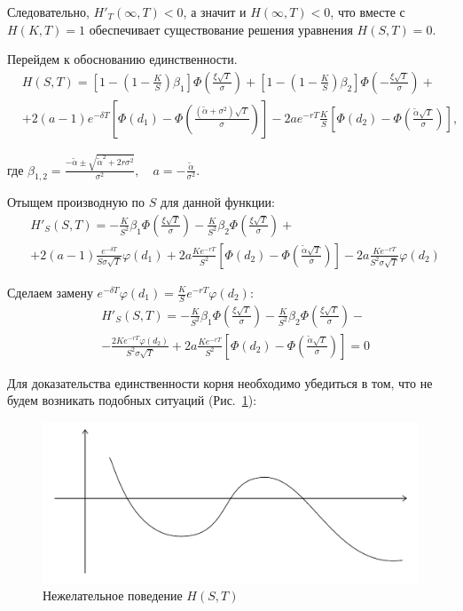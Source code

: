 \documentclass[oneside,final,12pt]{article}
\begin{document}
Следовательно, $H'_T(\infty,T)<0$, а значит и $H(\infty,T)<0$, что вместе с $H(K,T)=1$ обеспечивает существование решения уравнения $H(S,T)=0$.

Перейдем к обоснованию единственности. 
\begin{align*}
    & H(S,T) = \left[ 1 - \left(1-\frac{K}{S} \right)\beta_1 \right] \Phi\left(\frac{\xi\sqrt{T}}{\sigma}\right)
    + \left[ 1 - \left(1-\frac{K}{S} \right)\beta_2 \right] \Phi\left(-\frac{\xi\sqrt{T}}{\sigma}\right) + \\
    & + 2(a-1)e^{-\delta T} \left[ \Phi\left(d_1\right) - \Phi\left(\frac{(\widetilde{\alpha}+\sigma^2)\sqrt{T}}{\sigma}\right) \right] - 2ae^{-rT}\frac{K}{S} \left[ \Phi\left(d_2\right) - \Phi\left(\frac{\widetilde{\alpha}\sqrt{T}}{\sigma}\right) \right],
\end{align*}

\noindent
где $\beta_{1,2}=\frac{-\widetilde{\alpha}\pm\sqrt{\widetilde{\alpha}^2+2r\sigma^2}}{\sigma^2}, \quad a = -\frac{\widetilde{\alpha}}{\sigma^2}$.

Отыщем производную по $S$ для данной функции:
\begin{align*}
    & H'_S(S,T)=-\frac{K}{S^2}\beta_1 \Phi\left(\frac{\xi\sqrt{T}}{\sigma}\right) -\frac{K}{S^2}\beta_2 \Phi\left(\frac{\xi\sqrt{T}}{\sigma}\right) + \\ 
    & + 2(a-1)\frac{e^{-\delta T}}{S\sigma\sqrt{T}} \varphi(d_1) + 2a\frac{Ke^{-rT}}{S^2}\left[\Phi(d_2)-\Phi\left(\frac{\widetilde{\alpha}\sqrt{T}}{\sigma}\right)\right] - 2a\frac{Ke^{-rT}}{S^2\sigma\sqrt{T}} \varphi(d_2)
\end{align*}

Сделаем замену $e^{-\delta T}\varphi(d_1)=\frac{K}{S}e^{-rT}\varphi(d_2)$:
\begin{align*}
    &  H'_S(S,T)=-\frac{K}{S^2}\beta_1 \Phi\left(\frac{\xi\sqrt{T}}{\sigma}\right) -\frac{K}{S^2}\beta_2 \Phi\left(\frac{\xi\sqrt{T}}{\sigma}\right) - \\ 
    & - \frac{2Ke^{-rT}\varphi(d_2)}{S^2\sigma\sqrt{T}} + 2a\frac{Ke^{-rT}}{S^2}\left[\Phi(d_2)-\Phi\left(\frac{\widetilde{\alpha}\sqrt{T}}{\sigma}\right)\right] = 0
\end{align*}

Для доказательства единственности корня необходимо убедиться в том, что не будем возникать подобных ситуаций (Рис.~\ref{nezhelatelnoe_povedenie}):

\begin{figure}[h]
    \centering
    \includegraphics[scale=0.7]{Graph8.pdf}
    \caption{Нежелательное поведение $H(S,T)$}
    \label{nezhelatelnoe_povedenie}
\end{figure}
\end{document}
